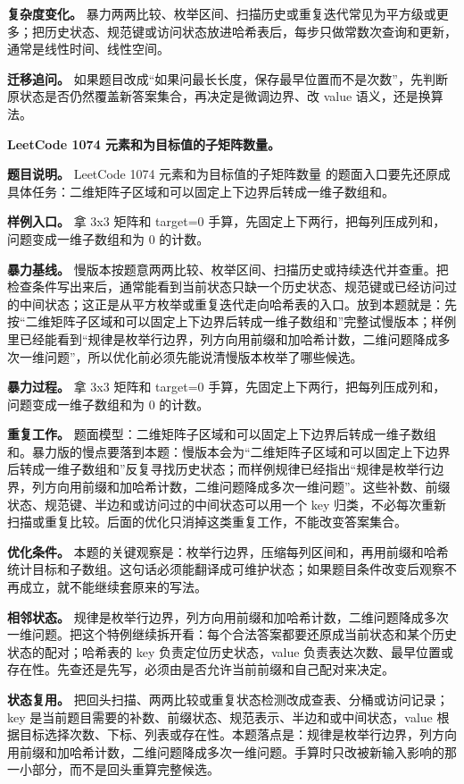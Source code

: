 \textbf{复杂度变化。} 暴力两两比较、枚举区间、扫描历史或重复迭代常见为平方级或更多；把历史状态、规范键或访问状态放进哈希表后，每步只做常数次查询和更新，通常是线性时间、线性空间。

\textbf{迁移追问。} 如果题目改成“如果问最长长度，保存最早位置而不是次数”，先判断原状态是否仍然覆盖新答案集合，再决定是微调边界、改 value 语义，还是换算法。

\noindent\textbf{LeetCode 1074 元素和为目标值的子矩阵数量。}

\textbf{题目说明。} LeetCode 1074 元素和为目标值的子矩阵数量 的题面入口要先还原成具体任务：二维矩阵子区域和可以固定上下边界后转成一维子数组和。

\textbf{样例入口。} 拿 3x3 矩阵和 target=0 手算，先固定上下两行，把每列压成列和，问题变成一维子数组和为 0 的计数。

\textbf{暴力基线。} 慢版本按题意两两比较、枚举区间、扫描历史或持续迭代并查重。把检查条件写出来后，通常能看到当前状态只缺一个历史状态、规范键或已经访问过的中间状态；这正是从平方枚举或重复迭代走向哈希表的入口。放到本题就是：先按“二维矩阵子区域和可以固定上下边界后转成一维子数组和”完整试慢版本；样例里已经能看到“规律是枚举行边界，列方向用前缀和加哈希计数，二维问题降成多次一维问题”，所以优化前必须先能说清慢版本枚举了哪些候选。

\textbf{暴力过程。} 拿 3x3 矩阵和 target=0 手算，先固定上下两行，把每列压成列和，问题变成一维子数组和为 0 的计数。

\textbf{重复工作。} 题面模型：二维矩阵子区域和可以固定上下边界后转成一维子数组和。暴力版的慢点要落到本题：慢版本会为“二维矩阵子区域和可以固定上下边界后转成一维子数组和”反复寻找历史状态；而样例规律已经指出“规律是枚举行边界，列方向用前缀和加哈希计数，二维问题降成多次一维问题”。这些补数、前缀状态、规范键、半边和或访问过的中间状态可以用一个 key 归类，不必每次重新扫描或重复比较。后面的优化只消掉这类重复工作，不能改变答案集合。

\textbf{优化条件。} 本题的关键观察是：枚举行边界，压缩每列区间和，再用前缀和哈希统计目标和子数组。这句话必须能翻译成可维护状态；如果题目条件改变后观察不再成立，就不能继续套原来的写法。

\textbf{相邻状态。} 规律是枚举行边界，列方向用前缀和加哈希计数，二维问题降成多次一维问题。把这个特例继续拆开看：每个合法答案都要还原成当前状态和某个历史状态的配对；哈希表的 key 负责定位历史状态，value 负责表达次数、最早位置或存在性。先查还是先写，必须由是否允许当前前缀和自己配对来决定。

\textbf{状态复用。} 把回头扫描、两两比较或重复状态检测改成查表、分桶或访问记录；key 是当前题目需要的补数、前缀状态、规范表示、半边和或中间状态，value 根据目标选择次数、下标、列表或存在性。本题落点是：规律是枚举行边界，列方向用前缀和加哈希计数，二维问题降成多次一维问题。手算时只改被新输入影响的那一小部分，而不是回头重算完整候选。

